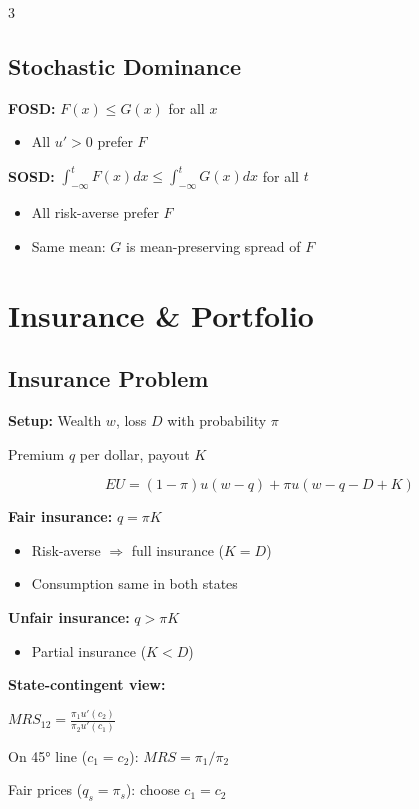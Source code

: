 \documentclass[10pt,landscape]{article}
\begin{document}
\begin{multicols}{3}
\subsection{Stochastic Dominance}

\textbf{FOSD:} $F(x) \leq G(x)$ for all $x$
\begin{itemize}[leftmargin=*,noitemsep]
\item All $u' > 0$ prefer $F$
\end{itemize}

\textbf{SOSD:} $\int_{-\infty}^t F(x)dx \leq \int_{-\infty}^t G(x)dx$ for all $t$
\begin{itemize}[leftmargin=*,noitemsep]
\item All risk-averse prefer $F$
\item Same mean: $G$ is mean-preserving spread of $F$
\end{itemize}

\section{Insurance \& Portfolio}

\subsection{Insurance Problem}

\textbf{Setup:} Wealth $w$, loss $D$ with probability $\pi$

Premium $q$ per dollar, payout $K$

$$EU = (1-\pi)u(w-q) + \pi u(w-q-D+K)$$

\textbf{Fair insurance:} $q = \pi K$
\begin{itemize}[leftmargin=*,noitemsep]
\item Risk-averse $\Rightarrow$ full insurance ($K = D$)
\item Consumption same in both states
\end{itemize}

\textbf{Unfair insurance:} $q > \pi K$
\begin{itemize}[leftmargin=*,noitemsep]
\item Partial insurance ($K < D$)
\end{itemize}

\textbf{State-contingent view:}

$MRS_{12} = \frac{\pi_1 u'(c_2)}{\pi_2 u'(c_1)}$

On 45° line ($c_1 = c_2$): $MRS = \pi_1/\pi_2$

Fair prices ($q_s = \pi_s$): choose $c_1 = c_2$


\end{multicols}
\end{document}
